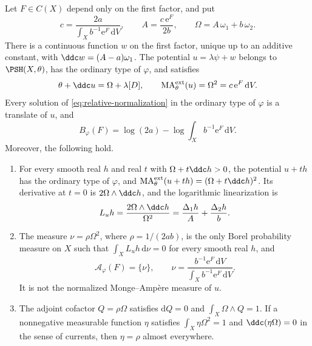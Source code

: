 \begin{theorem}\label{thm:nongauduchon-weak-adjoint}
Let $F\in C(X)$ depend only on the first factor, and put
\[
 c=\frac{2a}{\int_Xb^{-1}\mathrm e^F\,\mathrm dV},\qquad
 A=\frac{c\,\mathrm e^F}{2b},\qquad
 \Omega=A\,\omega_1+b\,\omega_2.
\]
There is a continuous function $w$ on the first factor, unique up to an additive constant, with $\ddc w=(A-a)\omega_1$. The potential $u=\lambda\psi+w$ belongs to $\PSH(X,\theta)$, has the ordinary type of $\varphi$, and satisfies
\[
 \theta+\ddc u=\Omega+\lambda[D],\qquad
 \mathrm{MA}^{\mathrm{ext}}_\theta(u)=\Omega^2=c\,\mathrm e^F\,\mathrm dV.
\]
Every solution of \eqref{eq:relative-normalization} in the ordinary type of $\varphi$ is a translate of $u$, and
\[
 B_\varphi(F)=\log(2a)-\log\int_Xb^{-1}\mathrm e^F\,\mathrm dV.
\]
Moreover, the following hold.
\begin{enumerate}
\item For every smooth real $h$ and real $t$ with $\Omega+t\ddc h>0$, the potential $u+th$ has the ordinary type of $\varphi$, and $\mathrm{MA}^{\mathrm{ext}}_\theta(u+th)=(\Omega+t\ddc h)^2$. Its derivative at $t=0$ is $2\Omega\wedge\ddc h$, and the logarithmic linearization is
\[
 L_uh=\frac{2\Omega\wedge\ddc h}{\Omega^2}
 =\frac{\Delta_1h}{A}+\frac{\Delta_2h}{b}.
\]
\item The measure $\nu=\rho\Omega^2$, where $\rho=1/(2ab)$, is the only Borel probability measure on $X$ such that $\int_XL_uh\,\mathrm d\nu=0$ for every smooth real $h$, and
\[
 \mathcal A_\varphi(F)=\{\nu\},\qquad
 \nu=\frac{b^{-1}\mathrm e^F\,\mathrm dV}{\int_Xb^{-1}\mathrm e^F\,\mathrm dV}.
\]
It is not the normalized Monge--Amp\`ere measure of $u$.
\item The adjoint cofactor $Q=\rho\Omega$ satisfies $\mathrm dQ=0$ and $\int_X\Omega\wedge Q=1$. If a nonnegative measurable function $\eta$ satisfies $\int_X\eta\Omega^2=1$ and $\ddc(\eta\Omega)=0$ in the sense of currents, then $\eta=\rho$ almost everywhere.
\end{enumerate}
\end{theorem}
